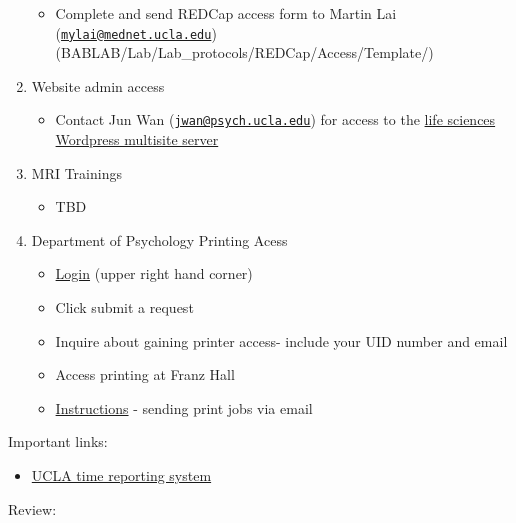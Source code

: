 \documentclass[]{book}
\providecommand{\tightlist}{%
  \setlength{\itemsep}{0pt}\setlength{\parskip}{0pt}}
\begin{document}
\begin{enumerate}
  \begin{itemize}
  \tightlist
  \item
    Complete and send REDCap access form to Martin Lai (\href{mailto:mylai@mednet.ucla.edu}{\nolinkurl{mylai@mednet.ucla.edu}}) (BABLAB/Lab/Lab\_protocols/REDCap/Access/Template/)
  \end{itemize}
\item
  Website admin access

  \begin{itemize}
  \tightlist
  \item
    Contact Jun Wan (\href{mailto:jwan@psych.ucla.edu}{\nolinkurl{jwan@psych.ucla.edu}}) for access to the \href{https://sites.lifesci.ucla.edu/}{life sciences Wordpress multisite server}
  \end{itemize}
\item
  MRI Trainings

  \begin{itemize}
  \tightlist
  \item
    TBD
  \end{itemize}
\item
  Department of Psychology Printing Acess

  \begin{itemize}
  \tightlist
  \item
    \href{https://support.lifesci.ucla.edu/hc/en-us}{Login} (upper right hand corner)
  \item
    Click submit a request
  \item
    Inquire about gaining printer access- include your UID number and email
  \item
    Access printing at Franz Hall
  \item
    \href{https://ucla.app.box.com/s/db0zzvgrydw1yz99yo1nlooq1j4n7jos}{Instructions} - sending print jobs via email
  \end{itemize}
\end{enumerate}

Important links:

\begin{itemize}
\tightlist
\item
  \href{24https://uctrs.it.ucla.edu/}{UCLA time reporting system}
\end{itemize}

Review:
\end{document}
